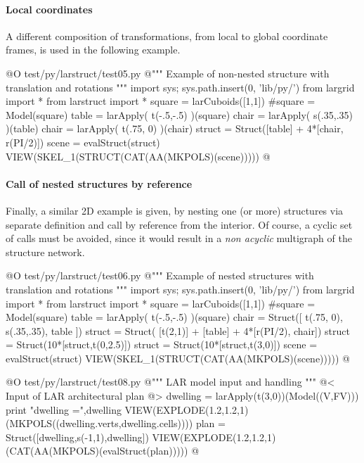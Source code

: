\documentclass[11pt,oneside]{article}    %
\begin{document}
\paragraph{Local coordinates}
A different composition of transformations, from local to global coordinate frames, is used in the following example.

@O test/py/larstruct/test05.py
@{""" Example of non-nested structure with translation and rotations """
import sys; sys.path.insert(0, 'lib/py/')
from largrid import *
from larstruct import *
square = larCuboids([1,1])
#square = Model(square)
table = larApply( t(-.5,-.5) )(square)
chair = larApply( s(.35,.35) )(table)
chair = larApply( t(.75, 0) )(chair)
struct = Struct([table] + 4*[chair, r(PI/2)])
scene = evalStruct(struct)
VIEW(SKEL_1(STRUCT(CAT(AA(MKPOLS)(scene)))))
@}

\paragraph{Call of nested structures by reference}
Finally, a similar 2D example is given, by nesting one (or more) structures via separate definition and call by reference from the interior. Of course, a cyclic set of calls must be avoided, since it would result in a \emph{non acyclic} multigraph of the structure network.

@O test/py/larstruct/test06.py
@{""" Example of nested structures with translation and rotations """
import sys; sys.path.insert(0, 'lib/py/')
from largrid import *
from larstruct import *
square = larCuboids([1,1])
#square = Model(square)
table = larApply( t(-.5,-.5) )(square)
chair = Struct([ t(.75, 0), s(.35,.35), table ])
struct = Struct( [t(2,1)] + [table] + 4*[r(PI/2), chair])
struct = Struct(10*[struct,t(0,2.5)])
struct = Struct(10*[struct,t(3,0)])
scene = evalStruct(struct)
VIEW(SKEL_1(STRUCT(CAT(AA(MKPOLS)(scene)))))
@}


@O test/py/larstruct/test08.py
@{""" LAR model input and handling """
@< Input of LAR architectural plan @>
dwelling = larApply(t(3,0))(Model((V,FV)))
print "\n dwelling =",dwelling
VIEW(EXPLODE(1.2,1.2,1)(MKPOLS((dwelling.verts,dwelling.cells))))
plan = Struct([dwelling,s(-1,1),dwelling])
VIEW(EXPLODE(1.2,1.2,1)(CAT(AA(MKPOLS)(evalStruct(plan)))))
@}
\end{document}
